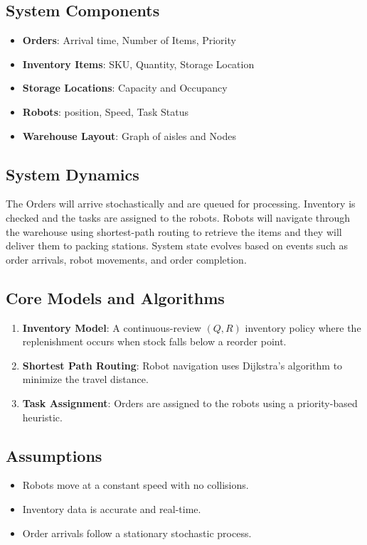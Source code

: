\documentclass[onecolumn,12pt]{IEEEtran}
\begin{document}
\subsection{System Components}
\begin{itemize}
    \item \textbf{Orders}: Arrival time, Number of Items, Priority
    \item \textbf{Inventory Items}: SKU, Quantity, Storage Location
    \item \textbf{Storage Locations}: Capacity and Occupancy
    \item \textbf{Robots}: position, Speed, Task Status
    \item \textbf{Warehouse Layout}: Graph of aisles and Nodes
\end{itemize}

\subsection{System Dynamics}
 The Orders will arrive stochastically and are queued for processing. Inventory is checked and the tasks are assigned to the robots. Robots will navigate through the warehouse using shortest-path routing to retrieve the items and they will deliver them to packing stations. System state evolves based on events such as order arrivals, robot movements, and order completion.

\subsection{Core Models and Algorithms}
\begin{enumerate}
    \item \textbf{Inventory Model}: A continuous-review $(Q, R)$ inventory policy where the replenishment occurs when stock falls below a reorder point.
    \item \textbf{Shortest Path Routing}: Robot navigation uses Dijkstra’s algorithm to minimize the travel distance.
    \item \textbf{Task Assignment}: Orders are assigned to the robots using a priority-based heuristic.
\end{enumerate}

\subsection{Assumptions}
\begin{itemize}
    \item Robots move at a constant speed with no collisions.
    \item Inventory data is accurate and real-time.
    \item Order arrivals follow a stationary stochastic process.
\end{itemize}
\end{document}
